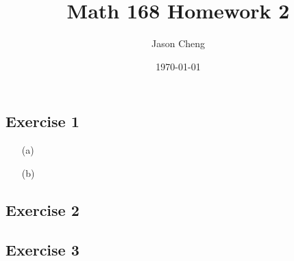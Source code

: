 \documentclass{article}
\title{Math 168 Homework 2}
\author{Jason Cheng}
\date{\today}
\begin{document}
\maketitle

\subsection*{Exercise 1}

\begin{enumerate}
  \item[(a)]
  \item[(b)]
\end{enumerate}

\newpage

\subsection*{Exercise 2}

\newpage

\subsection*{Exercise 3}
\end{document}
